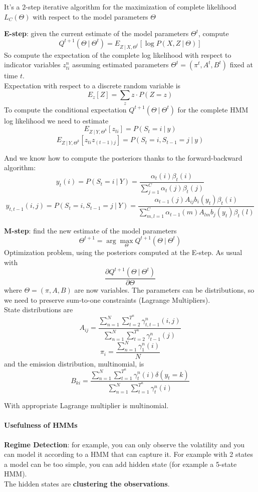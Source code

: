 \documentclass[10pt]{report}
\begin{document}
It's a 2-step iterative algorithm for the maximization of complete likelihood $L_C(\Theta)$ with respect to the model parameters $\Theta$\begin{list}{}{}
	\item \textbf{E-step}: given the current estimate of the model parameters $\Theta^t$, compute $$Q^{t+1}(\Theta\:|\:\Theta^t) = E_{Z\:|\:X,\Theta^t}[\log P(X,Z\:|\:\Theta)]$$
	So compute the expectation of the complete log likelihood with respect to indicator variables $z_{ti}^n$ assuming estimated parameters $\Theta^t = (\pi^t, A^t, B^t)$ fixed at time $t$.\\
	Expectation with respect to a discrete random variable is $$E_z[Z] = \sum_z z\cdot P(Z=z)$$
	To compute the conditional expectation $Q^{t+1}(\Theta\:|\:\Theta^t)$ for the complete HMM log likelihood we need to estimate $$E_{Z\:|\:Y,\Theta^k}[z_{ti}] = P(S_t=i\:|\:y)$$
	$$E_{Z\:|\:Y,\Theta^k}[z_{ti}z_{(t-1)j}] = P(S_t = i, S_{t-1}=j\:|\:y)$$
	\pagebreak
	
	And we know how to compute the posteriors thanks to the forward-backward algorithm:
	$$y_t(i) = P(S_t = i\:|\:Y) = \frac{\alpha_t(i)\beta_t(i)}{\sum_{j=1}^C\alpha_t(j)\beta_t(j)}$$
	$$y_{t,t-1}(i,j) = P(S_t = i, S_{t-1} = j\:|\:Y) = \frac{\alpha_{t-1}(j)A_{ij}b_i(y_t)\beta_t(i)}{\sum_{m,l=1}^C \alpha_{t-1}(m)A_{lm}b_j(y_t)\beta_t(l)}$$
	\item \textbf{M-step}: find the new estimate of the model parameters $$\Theta^{t+1} = \arg\max_\Theta Q^{t+1}(\Theta\:|\:\Theta^t)$$
	Optimization problem, using the posteriors computed at the E-step. As usual with $$\frac{\partial Q^{t+1}(\Theta\:|\:\Theta^t)}{\partial\Theta}$$
	where $\Theta = (\pi, A, B)$ are now variables. The parameters can be distributions, so we need to preserve sum-to-one constraints (Lagrange Multipliers).\\
	State distributions are
	$$A_{ij}=\frac{\sum_{n=1}^N\sum_{t=2}^{T^n} \gamma_{t,t-1}^n(i,j)}{\sum_{n=1}^N\sum_{t=2}^{T^n}\gamma_{t-1}^n(j)}$$
	$$\pi_i=\frac{\sum_{n=1}^N\gamma_1^n(i)}{N}$$
	and the emission distribution, multinomial, is
	$$B_{ki} = \frac{\sum_{n=1}^N\sum_{t=1}^{T^n}\gamma_t^n(i)\delta(y_t=k)}{\sum_{n=1}^N\sum_{t=1}^{T^n}\gamma_t^n(i)}$$
\end{list}
With appropriate Lagrange multiplier is multinomial.
\paragraph{Usefulness of HMMs}\begin{list}{}{}
	\item \textbf{Regime Detection}: for example, you can only observe the volatility and you can model it according to a HMM that can capture it. For example with 2 states a model can be too simple, you can add hidden state (for example a 5-state HMM).\\
	The hidden states are \textbf{clustering the observations}.
\end{list}
\end{document}

